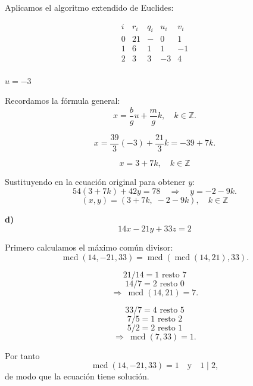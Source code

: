 \documentclass[a4paper,12pt]{article}
\begin{document}
\begin{ejercicio}[title=Ejercicio 33]

Aplicamos el algoritmo extendido de Euclides:

\[
\begin{array}{c|c|c|c|c}
i & r_i & q_i & u_i & v_i \\ \hline
0 & 21 & - & 0 & 1 \\
1 & 6 & 1 & 1 & -1 \\
2 & \boxed{3} & 3 & -3 & 4 \\
\end{array}
\]

$u = -3$

\vspace{0.5em}

Recordamos la fórmula general:
\[
x = \frac{b}{g}u + \frac{m}{g}k, \quad k\in\mathbb{Z}.
\]

\[
x = \frac{39}{3}(-3) + \frac{21}{3}k = -39 + 7k.
\]

\[
x = 3 + 7k, \quad k \in \mathbb{Z}
\]

\vspace{0.5em}

Sustituyendo en la ecuación original para obtener $y$:
\[
54(3+7k) + 42y = 78 \quad \Rightarrow \quad y = -2 - 9k.
\]
\[
\boxed{(x,y) = (3 + 7k,\; -2 - 9k), \quad k \in \mathbb{Z}}
\]

\vspace{1em}

\textbf{d)} \\[0.3em]
\[
14x - 21y + 33z = 2
\]

Primero calculamos el máximo común divisor:
\[
\operatorname{mcd}(14,-21,33)=\operatorname{mcd}(\operatorname{mcd}(14,21),33).
\]

\[
21 / 14 = 1 \text{ resto } \boxed{7}
\]
\[
14 / 7 = 2 \text{ resto } 0
\]
\[
\Rightarrow\ \operatorname{mcd}(14,21)=7.
\]

\[
33 / 7 = 4 \text{ resto } 5
\]
\[
7 / 5 = 1 \text{ resto } 2
\]
\[
5 / 2 = 2 \text{ resto } \boxed{1}
\]
\[
\Rightarrow\ \operatorname{mcd}(7,33)=1.
\]

Por tanto
\[
\operatorname{mcd}(14,-21,33)=1 \quad\text{y}\quad 1\mid 2,
\]
de modo que la ecuación tiene solución.

\end{ejercicio}
\end{document}
